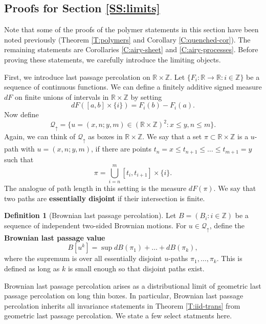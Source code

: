 \documentclass[aop, preprint]{imsart}
\theoremstyle{plain}
\theoremstyle{definition}
\newtheorem{definition}[theorem]{Definition}
\theoremstyle{plain}
\newcommand{\sset}{\subset}
\newcommand{\scrQ}{\mathcal{Q}}
\newcommand{\Z}{\mathds{Z}}
\newcommand{\R}{\mathds{R}}
\newcommand{\X}{\times}
\begin{document}
\subsection{Proofs for Section \ref{SS:limits}}
\label{SS:lim-proof}

Note that some of the proofs of the polymer statements in this section have been noted previously (Theorem \ref{T:polymers} and Corollary \ref{C:quenched-cor}). The remaining statements are Corollaries \ref{C:airy-sheet} and \ref{C:airy-processes}. Before proving these statements, we carefully introduce the limiting objects.

First, we introduce last passage percolation on $\R \X \Z$. Let $\{F_i: \R\to \R: i \in \Z\}$ be a sequence of continuous functions. We can define a finitely additive signed measure $dF$ on finite unions of intervals in $\R \X \Z$ by setting
$$
dF([a, b] \X \{i\}) = F_i(b) - F_i(a).
$$
Now define 
$$
\scrQ_\uparrow = \{u = (x, n; y, m) \in (\R \X \Z)^2 : x \le y, n \le m\}.
$$
Again, we can think of $\scrQ_\uparrow$ as boxes in $\R \X \Z$. We say that a set $\pi \sset \R \X \Z$ is a $u$-path with $u = (x, n; y, m)$, if there are points $t_n = x \le t_{n+1} \le \dots \le t_{m+1} = y$ such that 
$$
\pi = \bigcup_{i=n}^m [t_i, t_{i+1}] \X \{i\}.
$$
The analogue of path length in this setting is the measure $dF(\pi)$. We say that two paths are \textbf{essentially disjoint} if their intersection is finite. 

\begin{definition}[Brownian last passage percolation]
	Let $B = (B_i: i \in \Z)$ be a sequence of independent two-sided Brownian motions. For $u \in \scrQ_\uparrow$, define the \textbf{Brownian last passage value}
	$$
	B[u^k] = \sup dB(\pi_1) + \dots + dB(\pi_k),
	$$
	where the supremum is over all essentially disjoint $u$-paths $\pi_1, \dots, \pi_k$. This is defined as long as $k$ is small enough so that disjoint paths exist.
\end{definition}

Brownian last passage percolation arises as a distributional limit of geometric last passage percolation on long thin boxes. In particular, Brownian last passage percolation inherits all invariance statements in Theorem \ref{T:iid-trans} from geometric last passage percolation. We state a few select statments here. 
\end{document}
